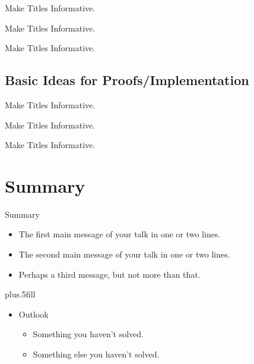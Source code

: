 \documentclass{beamer}
\begin{document}
\begin{frame}{Make Titles Informative.}
\end{frame}

\begin{frame}{Make Titles Informative.}
\end{frame}

\begin{frame}{Make Titles Informative.}
\end{frame}


\subsection{Basic Ideas for Proofs/Implementation}

\begin{frame}{Make Titles Informative.}
\end{frame}

\begin{frame}{Make Titles Informative.}
\end{frame}

\begin{frame}{Make Titles Informative.}
\end{frame}



\section*{Summary}

\begin{frame}{Summary}

  \begin{itemize}
  \item
    The \alert{first main message} of your talk in one or two lines.
  \item
    The \alert{second main message} of your talk in one or two lines.
  \item
    Perhaps a \alert{third message}, but not more than that.
  \end{itemize}
  
  \vskip0pt plus.5fill
  \begin{itemize}
  \item
    Outlook
    \begin{itemize}
    \item
      Something you haven't solved.
    \item
      Something else you haven't solved.
    \end{itemize}
  \end{itemize}
\end{frame}
\end{document}
